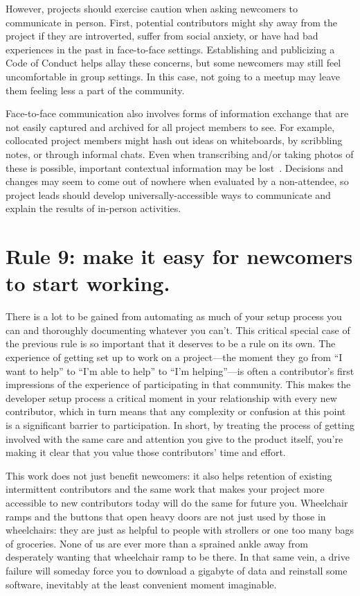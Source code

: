 \documentclass[10pt,letterpaper]{article}
\newcommand{\rulemajor}[1]{\section*{#1}}
\begin{document}
However,
projects should exercise caution when asking newcomers to communicate in person.
First, potential contributors might shy away from the project if they are introverted,
suffer from social anxiety,
or have had bad experiences in the past in face-to-face settings.
Establishing and publicizing a Code of Conduct helps allay these concerns,
but some newcomers may still feel uncomfortable in group settings.
In this case,
not going to a meetup may leave them feeling less a part of the community.

Face-to-face communication also involves forms of information exchange
that are not easily captured and archived for all project members to see.
For example,
collocated project members might hash out ideas on whiteboards,
by scribbling notes,
or through informal chats.
Even when transcribing and/or taking photos of these is possible,
important contextual information may be lost~\cite{cherubini2007}.
Decisions and changes may seem to come out of nowhere when evaluated by a non-attendee,
so project leads should develop universally-accessible ways to communicate and explain the results of in-person activities.

\rulemajor{Rule 9: make it easy for newcomers to start working.}

There is a lot to be gained from automating as much of your setup process you can
and thoroughly documenting whatever you can't.
This critical special case of the previous rule is so important that it deserves to be a rule on its own.
The experience of getting set up to work on a project---the moment they go from ``I want to help''
to ``I'm able to help'' to ``I'm helping''---is often a contributor's first impressions of
the experience of participating in that community.
This makes the developer setup process a critical moment in your relationship with every new contributor,
which in turn means that any complexity or confusion at this point is a significant barrier to participation.
In short, by treating the process of getting involved with the same care and attention you give
to the product itself, you're making it clear that you value those contributors' time and effort.

This work does not just benefit newcomers:
it also helps retention of existing intermittent contributors and the same work that makes your project more
accessible to new contributors today will do the same for future you.
Wheelchair ramps and the buttons that open heavy doors are not just used by those in wheelchairs:
they are just as helpful to people with strollers or one too many bags of groceries.
None of us are ever more than a sprained ankle away from desperately wanting that wheelchair ramp to be there.
In that same vein, a drive failure will someday force you to download a gigabyte of data
and reinstall some software, inevitably at the least convenient moment imaginable.
\end{document}
